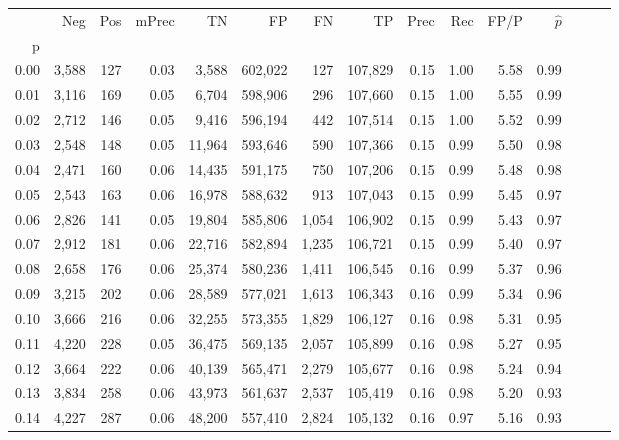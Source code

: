 \begin{tabular}{rrrrrrrrrrrrrrr}
\toprule
{} &     Neg &    Pos & mPrec &       TN &       FP &       FN &       TP &  Prec &   Rec &  FP/P & $\hat{p}$ \\
p    &         &        &       &          &          &          &          &       &       &       &           \\
\midrule
0.00 &   3,588 &    127 &  0.03 &    3,588 &  602,022 &      127 &  107,829 &  0.15 &  1.00 &  5.58 &      0.99 \\
0.01 &   3,116 &    169 &  0.05 &    6,704 &  598,906 &      296 &  107,660 &  0.15 &  1.00 &  5.55 &      0.99 \\
0.02 &   2,712 &    146 &  0.05 &    9,416 &  596,194 &      442 &  107,514 &  0.15 &  1.00 &  5.52 &      0.99 \\
0.03 &   2,548 &    148 &  0.05 &   11,964 &  593,646 &      590 &  107,366 &  0.15 &  0.99 &  5.50 &      0.98 \\
0.04 &   2,471 &    160 &  0.06 &   14,435 &  591,175 &      750 &  107,206 &  0.15 &  0.99 &  5.48 &      0.98 \\
0.05 &   2,543 &    163 &  0.06 &   16,978 &  588,632 &      913 &  107,043 &  0.15 &  0.99 &  5.45 &      0.97 \\
0.06 &   2,826 &    141 &  0.05 &   19,804 &  585,806 &    1,054 &  106,902 &  0.15 &  0.99 &  5.43 &      0.97 \\
0.07 &   2,912 &    181 &  0.06 &   22,716 &  582,894 &    1,235 &  106,721 &  0.15 &  0.99 &  5.40 &      0.97 \\
0.08 &   2,658 &    176 &  0.06 &   25,374 &  580,236 &    1,411 &  106,545 &  0.16 &  0.99 &  5.37 &      0.96 \\
0.09 &   3,215 &    202 &  0.06 &   28,589 &  577,021 &    1,613 &  106,343 &  0.16 &  0.99 &  5.34 &      0.96 \\
0.10 &   3,666 &    216 &  0.06 &   32,255 &  573,355 &    1,829 &  106,127 &  0.16 &  0.98 &  5.31 &      0.95 \\
0.11 &   4,220 &    228 &  0.05 &   36,475 &  569,135 &    2,057 &  105,899 &  0.16 &  0.98 &  5.27 &      0.95 \\
0.12 &   3,664 &    222 &  0.06 &   40,139 &  565,471 &    2,279 &  105,677 &  0.16 &  0.98 &  5.24 &      0.94 \\
0.13 &   3,834 &    258 &  0.06 &   43,973 &  561,637 &    2,537 &  105,419 &  0.16 &  0.98 &  5.20 &      0.93 \\
0.14 &   4,227 &    287 &  0.06 &   48,200 &  557,410 &    2,824 &  105,132 &  0.16 &  0.97 &  5.16 &      0.93 \\

\end{tabular}
